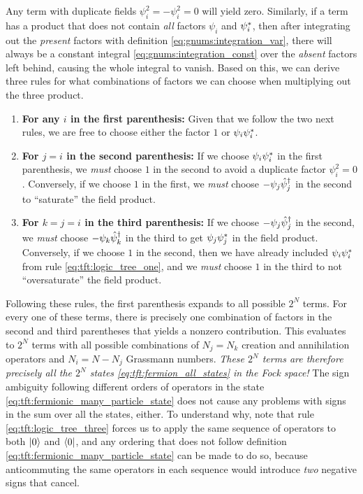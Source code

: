 Any term with duplicate fields $\psi_i^2 = -\psi_i^2 = 0$ will yield zero.
Similarly, if a term has a product that does not contain \emph{all} factors $\psi_i$ and ${\psi}^*_i$, then after integrating out the \emph{present} factors with definition \eqref{eq:gnums:integration_var}, there will always be a constant integral \eqref{eq:gnums:integration_const} over the \emph{absent} factors left behind, causing the whole integral to vanish.
Based on this, we can derive three rules for what combinations of factors we can choose when multiplying out the three product.
\begin{enumerate}
\item \textbf{For any $i$ in the first parenthesis:} Given that we follow the two next rules, we are free to choose either the factor $1$ or $\psi_i {\psi}^*_i$. \label{eq:tft:logic_tree_one}
\item \textbf{For $j=i$ in the second parenthesis:} 
If we choose $\psi_i {\psi}^*_i$ in the first parenthesis, we \emph{must} choose $1$ in the second to avoid a duplicate factor $\psi_i^2 = 0$.
Conversely, if we choose $1$ in the first, we \emph{must} choose $-\psi_j \hat\psi^\dagger_j$ in the second to ``saturate'' the field product.
\item \textbf{For $k = j = i$ in the third parenthesis:} 
If we choose $-\psi_j \hat\psi^\dagger_j$ in the second, we \emph{must} choose $-\psi_k \hat\psi^\dagger_k$ in the third to get $\psi_j {\psi}^*_j$ in the field product.
Conversely, if we choose $1$ in the second, then we have already included $\psi_i {\psi}^*_i$ from rule \ref{eq:tft:logic_tree_one}, and we \emph{must} choose $1$ in the third to not ``oversaturate'' the field product. \label{eq:tft:logic_tree_three}
\end{enumerate}
Following these rules, the first parenthesis expands to all possible $2^N$ terms.
For every one of these terms, there is precisely one combination of factors in the second and third parentheses that yields a nonzero contribution.
This evaluates to $2^N$ terms with all possible combinations of $N_j = N_k$ creation and annihilation operators and $N_i = N - N_j$ Grassmann numbers.
\emph{These $2^N$ terms are therefore precisely all the $2^N$ states \eqref{eq:tft:fermion_all_states} in the Fock space!}
The sign ambiguity following different orders of operators in the state \eqref{eq:tft:fermionic_many_particle_state} does not cause any problems with signs in the sum over all the states, either.
To understand why, note that rule \ref{eq:tft:logic_tree_three} forces us to apply the same sequence of operators to both $\ket{0}$ and $\bra{0}$, and any ordering that does not follow definition \eqref{eq:tft:fermionic_many_particle_state} can be made to do so, because anticommuting the same operators in each sequence would introduce \emph{two} negative signs that cancel.

